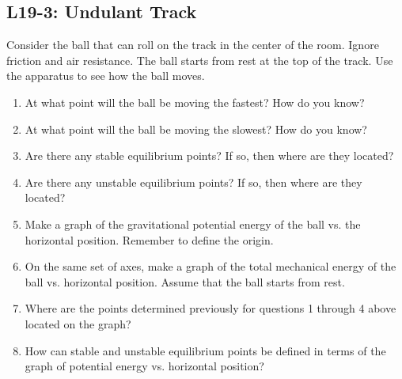 \documentclass[]{article}
\newcommand{\Week}{19}
\begin{document}
\begin{PresentSpace}
\vspace{-10pt}
\section*{L\Week-3: Undulant Track}
\vspace{-10pt}
\large
Consider the ball that can roll on the track in the center of the room. Ignore friction and air resistance. The ball starts from rest at the top of the track. Use the apparatus to see how the ball moves.
\begin{enumerate}[(1)]
	\item At what point will the ball be moving the fastest? How do you know?
	\item At what point will the ball be moving the slowest? How do you know?
	\item Are there any stable equilibrium points? If so, then where are they located?
	\item Are there any unstable equilibrium points? If so, then where are they located?
	\item Make a graph of the gravitational potential energy of the ball vs. the horizontal position. Remember to define the origin.
	\item On the same set of axes, make a graph of the total mechanical energy of the ball vs. horizontal position. Assume that the ball starts from rest.
	\item Where are the points determined previously for questions 1 through 4 above located on the graph?
	\item How can stable and unstable equilibrium points be defined in terms of the graph of potential energy vs. horizontal position?
\end{enumerate}
\end{PresentSpace}
\end{document}

